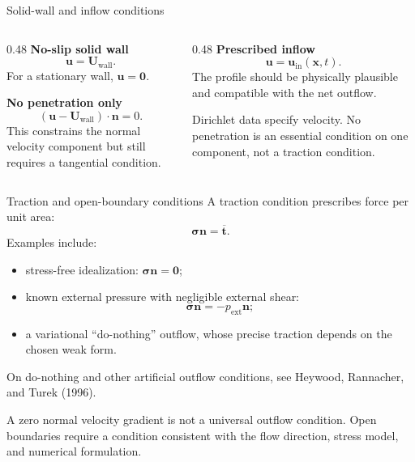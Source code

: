 \documentclass[aspectratio=169,11pt]{beamer}
\newcommand{\uvec}{\bm{u}}
\newcommand{\xvec}{\bm{x}}
\newcommand{\nvec}{\bm{n}}
\newcommand{\tvec}{\bm{t}}
\newcommand{\stress}{\bm{\sigma}}
\begin{document}
\begin{frame}{Solid-wall and inflow conditions}
\begin{columns}[T,onlytextwidth]
\begin{column}{0.48\textwidth}
\textbf{No-slip solid wall}
\[
  \uvec=\mathbf{U}_{\mathrm{wall}}.
\]
For a stationary wall, $\uvec=\mathbf{0}$.

\medskip
\textbf{No penetration only}
\[
  (\uvec-\mathbf{U}_{\mathrm{wall}})\cdot\nvec=0.
\]
This constrains the normal velocity component but still requires a tangential condition.
\end{column}
\begin{column}{0.48\textwidth}
\textbf{Prescribed inflow}
\[
  \uvec=\uvec_{\mathrm{in}}(\xvec,t).
\]
The profile should be physically plausible and compatible with the net outflow.

\medskip
\begin{punchbox}
\small Dirichlet data specify velocity. No penetration is an essential condition on one component, not a traction condition.
\end{punchbox}
\end{column}
\end{columns}
\end{frame}

\begin{frame}{Traction and open-boundary conditions}
A traction condition prescribes force per unit area:
\[
  \stress\nvec=\overline{\tvec}.
\]
Examples include:
\begin{itemize}\itemsep6pt
  \item stress-free idealization: $\stress\nvec=\mathbf{0}$;
  \item known external pressure with negligible external shear:
  \[
    \stress\nvec=-p_{\mathrm{ext}}\nvec;
  \]
  \item a variational ``do-nothing'' outflow, whose precise traction depends on the chosen weak form.
\end{itemize}
{\scriptsize\color{DarkGray} On do-nothing and other artificial outflow conditions, see Heywood, Rannacher, and Turek (1996).\par}

\begin{punchbox}
\small A zero normal velocity gradient is not a universal outflow condition. Open boundaries require a condition consistent with the flow direction, stress model, and numerical formulation.
\end{punchbox}
\end{frame}
\end{document}
